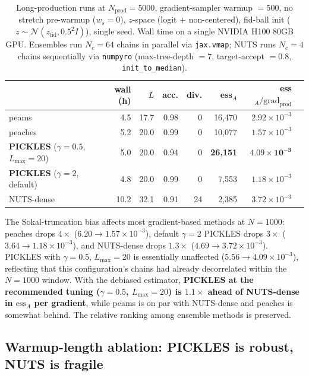 \documentclass{article}
\newcommand{\gN}{\mathcal{N}}
\begin{document}
\begin{table}[t]
\centering
\caption{Long-production runs at $N_{\text{prod}} = 5000$, gradient-sampler
warmup $= 500$, no stretch pre-warmup ($w_s = 0$), $z$-space (logit +
non-centered), fid-ball init ($z \sim \gN(z_{\text{fid}}, 0.5^2 I)$),
single seed.  Wall time on a single NVIDIA H100 80GB GPU.  Ensembles run
$N_c = 64$ chains in parallel via \texttt{jax.vmap}; NUTS runs $N_c = 4$
chains sequentially via \texttt{numpyro} (max-tree-depth $= 7$,
target-accept $= 0.8$, \texttt{init\_to\_median}).}
\label{tab:desLongN}
\small
\begin{tabular}{l rrrr rr r}
\toprule
& wall (h) & $\bar L$ & acc. & div. & ess$_A$ & ess$_A/\text{grad}_{\text{prod}}$ \\
\midrule
peams                                 & 4.5  & 17.7 & 0.98 & 0  & 16{,}470  & $2.92\!\times\!10^{-3}$ \\
peaches                               & 5.2  & 20.0 & 0.99 & 0  & 10{,}077  & $1.57\!\times\!10^{-3}$ \\
\textbf{PICKLES} ($\gamma{=}0.5$, $L_{\max}{=}20$) & 5.0 & 20.0 & 0.94 & 0 & \textbf{26{,}151} & $\boldsymbol{4.09\!\times\!10^{-3}}$ \\
\textbf{PICKLES} ($\gamma{=}2$, default)        & 4.8 & 20.0 & 0.99 & 0 & 7{,}553  & $1.18\!\times\!10^{-3}$ \\
NUTS-dense                             & 10.2 & 32.1 & 0.91 & 24 & 2{,}385  & $3.72\!\times\!10^{-3}$ \\
\bottomrule
\end{tabular}
\end{table}

The Sokal-truncation bias affects most gradient-based methods at
$N=1000$: peaches drops $4\times$ ($6.20 \to 1.57 \times 10^{-3}$),
default $\gamma=2$ PICKLES drops $3\times$ ($3.64 \to 1.18\times 10^{-3}$),
and NUTS-dense drops $1.3\times$ ($4.69 \to 3.72\times 10^{-3}$).
PICKLES with $\gamma=0.5$, $L_{\max}=20$ is essentially unaffected
($5.56 \to 4.09\times 10^{-3}$), reflecting that this configuration's
chains had already decorrelated within the $N=1000$ window. With the
debiased estimator, \textbf{PICKLES at the recommended tuning
($\gamma=0.5$, $L_{\max}=20$) is $1.1\times$ ahead of NUTS-dense in
$\mathrm{ess}_A$ per gradient}, while peams is on par with NUTS-dense
and peaches is somewhat behind. The relative ranking among ensemble
methods is preserved.

\subsection{Warmup-length ablation: PICKLES is robust, NUTS is fragile}\label{ssec:desWarmupSweep}
\end{document}
